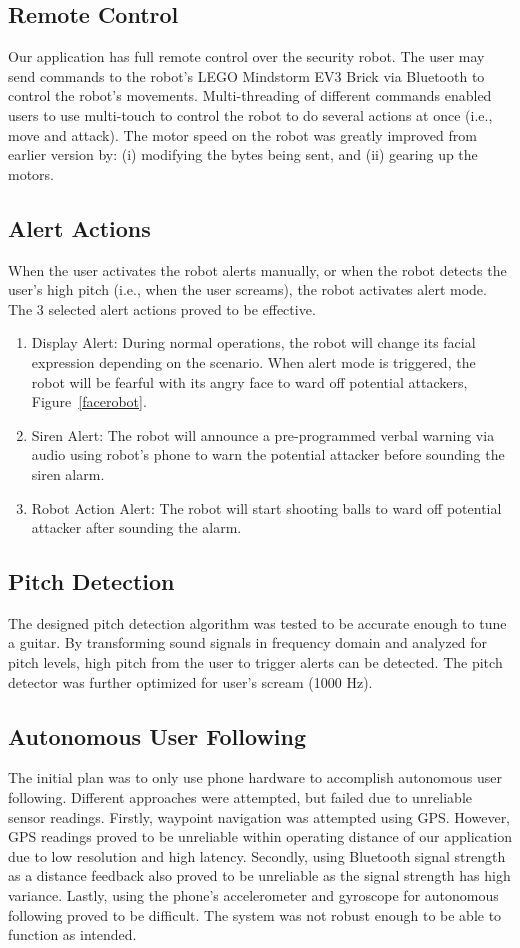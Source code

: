 \documentclass[12pt]{article}
\begin{document}
\subsection{Remote Control}
Our application has full remote control over the security robot. The user may send commands to the robot's LEGO Mindstorm EV3 Brick via Bluetooth to control the robot's movements. Multi-threading of different commands enabled users to use multi-touch to control the robot to do several actions at once (i.e., move and attack). The motor speed on the robot was greatly improved from earlier version by: (i) modifying the bytes being sent, and  (ii) gearing up the motors.

\subsection{Alert Actions}
When the user activates the robot alerts manually, or when the robot detects the user's high pitch (i.e., when the user screams), the robot activates alert mode. The 3 selected alert actions proved to be effective.

\begin{enumerate}
\item Display Alert: During normal operations, the robot will change its facial expression depending on the scenario. When alert mode is triggered, the robot will be fearful with its angry face to ward off potential attackers, Figure~\ref{facerobot}.
\item Siren Alert: The robot will announce a pre-programmed verbal warning via audio using robot's phone to warn the potential attacker before sounding the siren alarm.
\item Robot Action Alert: The robot will start shooting balls to ward off potential attacker after sounding the alarm.
\end{enumerate}

\subsection{Pitch Detection}
The designed pitch detection algorithm was tested to be accurate enough to tune a guitar. By transforming sound signals in frequency domain and analyzed for pitch levels, high pitch from the user to trigger alerts can be detected. The pitch detector was further optimized for user's scream (1000 Hz).

\subsection{Autonomous User Following}
The initial plan was to only use phone hardware to accomplish autonomous user following. Different approaches were attempted, but failed due to unreliable sensor readings. Firstly, waypoint navigation was attempted using GPS. However, GPS readings proved to be unreliable within operating distance of our application due to low resolution and high latency. Secondly, using Bluetooth signal strength as a distance feedback also proved to be unreliable as the signal strength has high variance. Lastly, using the phone's accelerometer and gyroscope for autonomous following proved to be difficult. The system was not robust enough to be able to function as intended.
\end{document}
